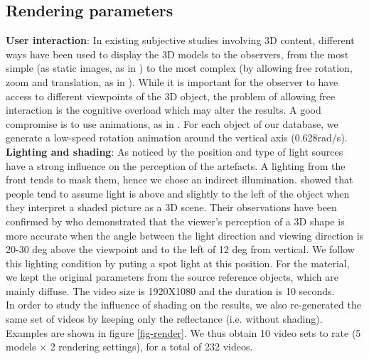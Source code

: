 \subsection{Rendering parameters}
\noindent\textbf{User interaction}:
In existing subjective studies involving 3D content, different ways have been used to display the 3D models to the observers, from the most simple (as static images, as in \cite{Watson2001}) to the most complex (by allowing free rotation, zoom and translation, as in \cite{Corsini2007}). While it is important for the observer to have access to different viewpoints of the 3D object, the problem of allowing free interaction is the cognitive overload which may alter the results. A good compromise is to use animations, as in \cite{Pan2005}. For each object of our database, we generate a low-speed rotation animation around the vertical axis (0.628rad/s).\\
\noindent\textbf{Lighting and shading}:
As noticed by \citet{Rogowitz2001} the position and type of light sources have a strong influence on the perception of the artefacts. A lighting from the front tends to mask them, hence we chose an indirect illumination. \citet{Sun1998} showed that people tend to assume light is above and slightly to the left of the object when they interpret a shaded picture as a 3D scene. Their observations have been confirmed by \citet{O'Shea2008} who demonstrated that the viewer’s perception of a 3D shape is more accurate when the angle between the light direction and viewing direction is 20-30 deg above the viewpoint and to the left of 12 deg from vertical. We follow this lighting condition by puting a spot light at this position. For the material, we kept the original parameters from the source reference objects, which are mainly diffuse. The video size is 1920X1080 and the duration is 10 seconds.\\
In order to study the influence of shading on the results, we also re-generated the same set of videos by keeping only the reflectance (i.e. without shading). Examples are shown in figure \ref{fig-render}. We thus obtain 10 video sets to rate (5 models $\times$ 2 rendering settings), for a total of 232 videos.  
